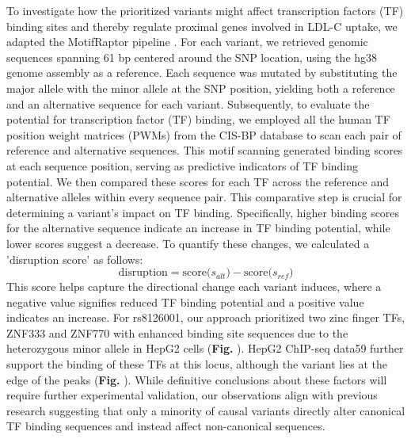\documentclass[a4paper, titlepage, openright]{book}
\begin{document}
To investigate how the prioritized variants might affect transcription factors (TF) binding sites and thereby regulate proximal genes involved in LDL-C uptake, we adapted the MotifRaptor pipeline \citep{yao2021motif}. For each variant, we retrieved genomic sequences spanning 61 bp centered around the SNP location, using the hg38 genome assembly as a reference. Each sequence was mutated by substituting the major allele with the minor allele at the SNP position, yielding both a reference and an alternative sequence for each variant. Subsequently, to evaluate the potential for transcription factor (TF) binding, we employed all the human TF position weight matrices (PWMs) from the CIS-BP database \citep{weirauch2014determination} to scan each pair of reference and alternative sequences. This motif scanning generated binding scores at each sequence position, serving as predictive indicators of TF binding potential. 
We then compared these scores for each TF across the reference and alternative alleles within every sequence pair. This comparative step is crucial for determining a variant's impact on TF binding. Specifically, higher binding scores for the alternative sequence indicate an increase in TF binding potential, while lower scores suggest a decrease. To quantify these changes, we calculated a 'disruption score' as follows: 
\[
\text{disruption} = \textrm{score($s_{alt}$)}- \textrm{score($s_{ref}$)}
\]
This score helps capture the directional change each variant induces, where a negative value signifies reduced TF binding potential and a positive value indicates an increase. For rs8126001, our approach prioritized two zinc finger TFs, ZNF333 and ZNF770 with enhanced binding site sequences due to the heterozygous minor allele in HepG2 cells (\textbf{Fig. }). HepG2 ChIP-seq data59 further support the binding of these TFs at this locus, although the variant lies at the edge of the peaks (\textbf{Fig. }). While definitive conclusions about these factors will require further experimental validation, our observations align with previous research \citep{farh2015genetic} suggesting that only a minority of causal variants directly alter canonical TF binding sequences and instead affect non-canonical sequences. 
\end{document}
